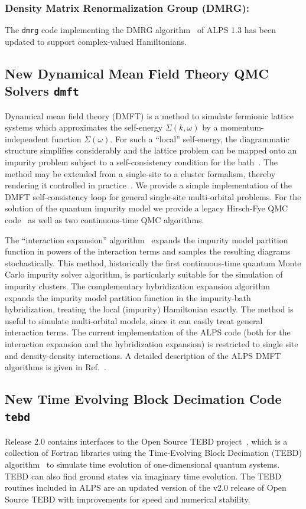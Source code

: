 \documentclass[12pt]{iopart}
\begin{document}
  
\subsubsection{Density Matrix Renormalization Group (DMRG):} The {\tt dmrg} code implementing the DMRG algorithm~\cite{White1992,Schollwock2005}  of ALPS 1.3 has been updated to support complex-valued Hamiltonians.

\subsection{New Dynamical Mean Field Theory QMC Solvers {\tt dmft}}
Dynamical mean field theory (DMFT) is a method to simulate fermionic lattice systems which approximates the self-energy $\Sigma(k,\omega)$ by a momentum-independent 
function $\Sigma(\omega)$. For such a ``local'' self-energy, the diagrammatic structure simplifies considerably and the lattice problem can be mapped onto an impurity problem subject to a self-consistency condition for the bath~\cite{Georges96,Kotliar06}. The method may be extended from a single-site to a cluster formalism, thereby rendering it controlled in practice~\cite{Maier05}.
We provide a simple implementation of the DMFT self-consistency loop for general single-site multi-orbital problems.
For the solution of the quantum impurity model we provide a legacy Hirsch-Fye QMC code~\cite{Hirsch86} as well as two continuous-time QMC algorithms.

The ``interaction expansion'' algorithm~\cite{Rubtsov04,Rubtsov05} expands the impurity model partition function in powers of the interaction terms and samples the resulting diagrams stochastically. This method, historically
the first continuous-time quantum Monte Carlo impurity solver algorithm, is particularly suitable for the simulation of impurity clusters.
The complementary hybridization expansion algorithm~\cite{Werner06,Werner06Kondo} expands the impurity model partition function in the impurity-bath hybridization, treating 
the local (impurity) Hamiltonian exactly. 
The method is useful to simulate multi-orbital models, since it can easily treat general interaction terms. 
The current implementation of the ALPS code (both for the interaction expansion and the hybridization expansion) is restricted to single site and density-density interactions.
A detailed description of the ALPS DMFT algorithms is given in Ref.~\cite{ALPSDMFT}.


\subsection{New Time Evolving Block Decimation Code {\tt tebd}}
Release 2.0 contains interfaces to the Open Source TEBD project~\cite{ostebd}, which is a collection of Fortran libraries using the Time-Evolving Block Decimation (TEBD) algorithm~\cite{vidal1, vidal2} to simulate time evolution of one-dimensional quantum systems.  TEBD can also find ground states via imaginary time evolution.  The TEBD routines included in ALPS are an updated version of the v2.0 release of Open Source TEBD with improvements for speed and numerical stability.
\end{document}
